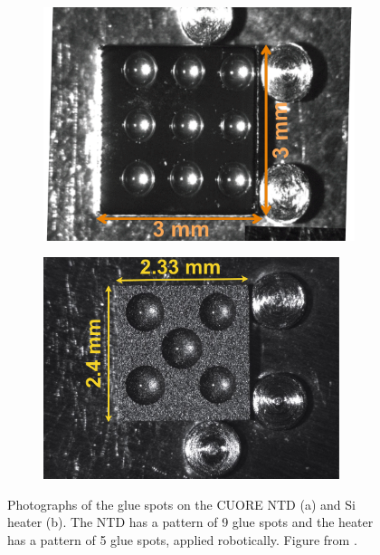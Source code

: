 \begin{figure}[htbp]
\centering
\begin{subfigure}[t]{0.45\textwidth}
\centering
    \includegraphics[width=0.95\linewidth]{Figures/fig10a.pdf}
\caption{}
\label{fig:glue_NTD}
\end{subfigure}
\qquad
\begin{subfigure}[t]{0.45\textwidth}
\centering
\includegraphics[width=0.95\textwidth]{Figures/fig10b.pdf}
\caption{}
\label{fig:glue_Si}
\end{subfigure}
\caption[Photographs of the glue spots on the CUORE NTD (a) and Si heater (b)]
{Photographs of the glue spots on the CUORE NTD (a) and Si heater (b).
The NTD has a pattern of 9 glue spots and the heater has a pattern of 5 glue spots, applied robotically.
Figure from \cite{Alduino:2016vjd}.}
\label{fig:glue}
\end{figure}

